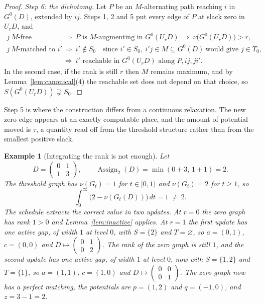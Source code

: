 \documentclass[11pt]{article}
\newtheorem{example}[theorem]{Example}
\newcommand{\Assign}{\operatorname{Assign}}
\begin{document}
\begin{proof}
\emph{Step 6: the dichotomy.}  Let $P$ be an $M$-alternating path reaching $i$
in $G^{0}(D)$, extended by $ij$.  Steps 1, 2 and 5 put every edge of $P$ at
slack zero in $U_rD$, and
\begin{align*}
  j\ M\text{-free}
    &\ \Longrightarrow\ P \text{ is $M$-augmenting in } G^{0}(U_rD)
    \ \Longrightarrow\ \nu\bigl(G^{0}(U_rD)\bigr)>r,\\
  j\ M\text{-matched to } i'
    &\ \Longrightarrow\ i'\notin S_0
    \quad\text{since } i'\in S_0,\ i'j\in M\subseteq G^{0}(D)
    \ \text{would give } j\in T_0,\\
    &\ \Longrightarrow\ i' \text{ reachable in } G^{0}(U_rD)
    \text{ along } P,ij,ji' .
\end{align*}
In the second case, if the rank is still $r$ then $M$ remains maximum, and by
Lemma~\ref{lem:canonical}(4) the reachable set does not depend on that choice,
so $S(G^{0}(U_rD))\supsetneq S_0$.
\end{proof}

Step 5 is where the construction differs from a continuous relaxation.  The new
zero edge appears at an exactly computable place, and the amount of potential
moved is $\tau$, a quantity read off from the threshold structure rather than
from the smallest positive slack.

\begin{example}[Integrating the rank is not enough]
\label{ex:two-by-two}
Let
\[
  D=\begin{pmatrix}0&1\\1&3\end{pmatrix},
  \qquad
  \Assign_2(D)=\min(0+3,\,1+1)=2 .
\]
The threshold graph has $\nu(G_t)=1$ for $t\in[0,1)$ and $\nu(G_t)=2$ for
$t\ge1$, so
\[
  \int_0^{\infty}\bigl(2-\nu(G_t(D))\bigr)\,dt=1\ \ne\ 2 .
\]
The schedule extracts the correct value in two updates.  At $r=0$ the zero graph
has rank $1>0$ and Lemma~\ref{lem:inactive} applies.  At $r=1$ the first update
has one active gap, of width $1$ at level $0$, with $S=\{2\}$ and
$T=\varnothing$, so $a=(0,1)$, $c=(0,0)$ and
$D\mapsto\left(\begin{smallmatrix}0&1\\0&2\end{smallmatrix}\right)$.  The rank of
the zero graph is still $1$, and the second update has one active gap, of width
$1$ at level $0$, now with $S=\{1,2\}$ and $T=\{1\}$, so $a=(1,1)$, $c=(1,0)$ and
$D\mapsto\left(\begin{smallmatrix}0&0\\0&1\end{smallmatrix}\right)$.  The zero
graph now has a perfect matching, the potentials are $p=(1,2)$ and $q=(-1,0)$,
and $z=3-1=2$.
\end{example}
\end{document}
